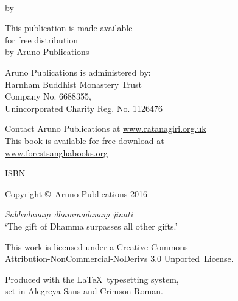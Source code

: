 
\cleartoverso
\thispagestyle{empty}

{\copyrightsize
\centering
\setlength{\parindent}{0pt}%
\setlength{\parskip}{0.8\baselineskip}%

\thetitle\\
by \theauthor

This publication is made available\\
for free distribution\\
by Aruno Publications

Aruno Publications is administered by:\\
Harnham Buddhist Monastery Trust\\
Company No. 6688355,\\
Unincorporated Charity Reg. No. 1126476

Contact Aruno Publications at \href{http://ratanagiri.org.uk/}{www.ratanagiri.org.uk}\\
This book is available for free download at\\
\href{http://forestsanghabooks.org/}{www.forestsanghabooks.org}

ISBN \theISBN

\theEditionInfo

Copyright \copyright\ Aruno Publications 2016

\vfill

\textit{Sabbadānaṃ dhammadānaṃ jinati}\\
‘The gift of Dhamma surpasses all other gifts.’

This work is licensed under a Creative Commons\\
Attribution-NonCommercial-NoDerivs 3.0 Unported~License.

Produced with the \LaTeX\ typesetting system,\\
set in Alegreya Sans and Crimson Roman.

}
